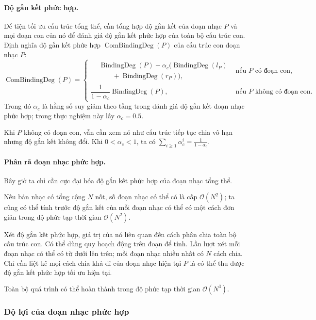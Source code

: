 \documentclass[11pt]{article}
\newcommand{\Oh}{\mathcal{O}}
\begin{document}
\paragraph{Độ gắn kết phức hợp.}
Để tiện tối ưu cấu trúc tổng thể, cần tổng hợp độ gắn kết của đoạn nhạc \(P\)
và mọi đoạn con của nó để đánh giá độ gắn kết phức hợp của toàn bộ cấu trúc
con. Định nghĩa độ gắn kết phức hợp \(\operatorname{ComBindingDeg}(P)\) của
cấu trúc con đoạn nhạc \(P\):
\[
\operatorname{ComBindingDeg}(P)=
\begin{cases}
\begin{aligned}
&\operatorname{BindingDeg}(P)+\alpha_c
(\operatorname{BindingDeg}(l_P)\\
&\qquad+\operatorname{BindingDeg}(r_P)),
\end{aligned}
& \text{nếu \(P\) có đoạn con},\\[0.4em]
\dfrac{1}{1-\alpha_c}\operatorname{BindingDeg}(P),
& \text{nếu \(P\) không có đoạn con}.
\end{cases}
\]
Trong đó \(\alpha_c\) là hằng số suy giảm theo tầng trong đánh giá độ gắn kết
đoạn nhạc phức hợp; trong thực nghiệm này lấy \(\alpha_c=0.5\).

Khi \(P\) không có đoạn con, vẫn cần xem nó như cấu trúc tiếp tục chia vô hạn
nhưng độ gắn kết không đổi. Khi \(0<\alpha_c<1\), ta có
\(\sum_{i\ge1}\alpha_c^i=\frac{1}{1-\alpha_c}\).

\paragraph{Phân rã đoạn nhạc phức hợp.}
Bây giờ ta chỉ cần cực đại hóa độ gắn kết phức hợp của đoạn nhạc tổng thể.

Nếu bản nhạc có tổng cộng \(N\) nốt, số đoạn nhạc có thể có là cấp
\(\Oh(N^2)\); ta cũng có thể tính trước độ gắn kết của mỗi đoạn nhạc có thể
có một cách đơn giản trong độ phức tạp thời gian \(\Oh(N^2)\).

Xét độ gắn kết phức hợp, giá trị của nó liên quan đến cách phân chia toàn bộ
cấu trúc con. Có thể dùng quy hoạch động trên đoạn để tính. Lần lượt xét mỗi
đoạn nhạc có thể có từ dưới lên trên; mỗi đoạn nhạc nhiều nhất có \(N\) cách
chia. Chỉ cần liệt kê mọi cách chia khả dĩ của đoạn nhạc hiện tại \(P\) là có
thể thu được độ gắn kết phức hợp tối ưu hiện tại.

Toàn bộ quá trình có thể hoàn thành trong độ phức tạp thời gian \(\Oh(N^3)\).

\subsubsection{Độ lợi của đoạn nhạc phức hợp}
\end{document}
